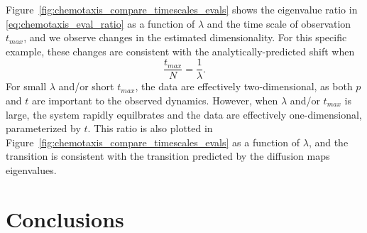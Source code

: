 \documentclass[preprint]{elsarticle}
\begin{document}
Figure~\ref{fig:chemotaxis_compare_timescales_evals} shows the eigenvalue ratio in \eqref{eq:chemotaxis_eval_ratio} as a function of $\lambda$ and the time scale of observation $t_{max}$, and we observe changes in the estimated dimensionality.
%
%
%
For this specific example, these changes are consistent with the analytically-predicted shift when 
\begin{equation}
\frac{t_{max}}{N} = \frac{1}{\lambda}.
\end{equation} 
%
For small $\lambda$ and/or short $t_{max}$, the data are effectively two-dimensional, as both $p$ and $t$ are important to the observed dynamics. 
%
However, when $\lambda$ and/or $t_{max}$ is large, the system rapidly equilbrates and the data are effectively one-dimensional, parameterized by $t$. 
%
This ratio is also plotted in Figure~\ref{fig:chemotaxis_compare_timescales_evals} as a function of $\lambda$, and the transition is consistent with the transition predicted by the diffusion maps eigenvalues. 


\section{Conclusions}
\end{document}

